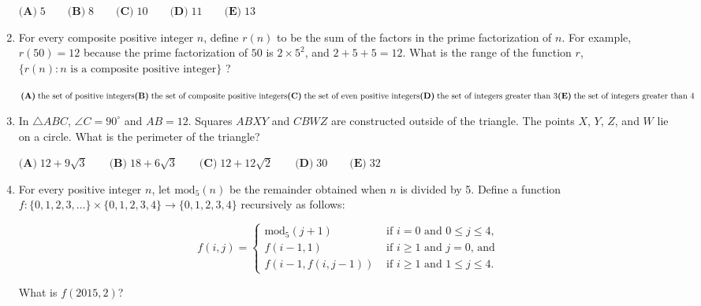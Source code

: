 \documentclass{article}
\begin{document}
\begin{enumerate}[label=\arabic*., itemsep=0.5em]
$\textbf{(A)}\; 5 \qquad\textbf{(B)}\; 8 \qquad\textbf{(C)}\; 10 \qquad\textbf{(D)}\; 11 \qquad\textbf{(E)}\; 13$\par \vspace{0.5em}\item For every composite positive integer $n$, define $r(n)$ to be the sum of the factors in the prime factorization of $n$. For example, $r(50) = 12$ because the prime factorization of $50$ is $2 \times 5^{2}$, and $2 + 5 + 5 = 12$. What is the range of the function $r$, $\{r(n): n \text{ is a composite positive integer}\}$ ?

$\textbf{(A)}\; \text{the set of positive integers} \\
\textbf{(B)}\; \text{the set of composite positive integers} \\
\textbf{(C)}\; \text{the set of even positive integers} \\
\textbf{(D)}\; \text{the set of integers greater than 3} \\
\textbf{(E)}\; \text{the set of integers greater than 4}$\par \vspace{0.5em}\item In $\triangle ABC$, $\angle C = 90^\circ$ and $AB = 12$. Squares $ABXY$ and $CBWZ$ are constructed outside of the triangle. The points $X$, $Y$, $Z$, and $W$ lie on a circle. What is the perimeter of the triangle?

$\textbf{(A)}\; 12+9\sqrt{3} \qquad\textbf{(B)}\; 18+6\sqrt{3} \qquad\textbf{(C)}\; 12+12\sqrt{2} \qquad\textbf{(D)}\; 30 \qquad\textbf{(E)}\; 32$\par \vspace{0.5em}\item For every positive integer $n$, let $\text{mod}_5 (n)$ be the remainder obtained when $n$ is divided by 5. Define a function $f: \{0,1,2,3,\dots\} \times \{0,1,2,3,4\} \to \{0,1,2,3,4\}$ recursively as follows:


\begin{equation*}
f(i,j) = \begin{cases}\text{mod}_5 (j+1) & \text{ if } i = 0 \text{ and } 0 \le j \le 4 \text{,}\\
f(i-1,1) & \text{ if } i \ge 1 \text{ and } j = 0 \text{, and} \\
f(i-1, f(i,j-1)) & \text{ if } i \ge 1 \text{ and } 1 \le j \le 4.
\end{cases}
\end{equation*}
  

What is $f(2015,2)$?


\end{enumerate}
\end{document}

